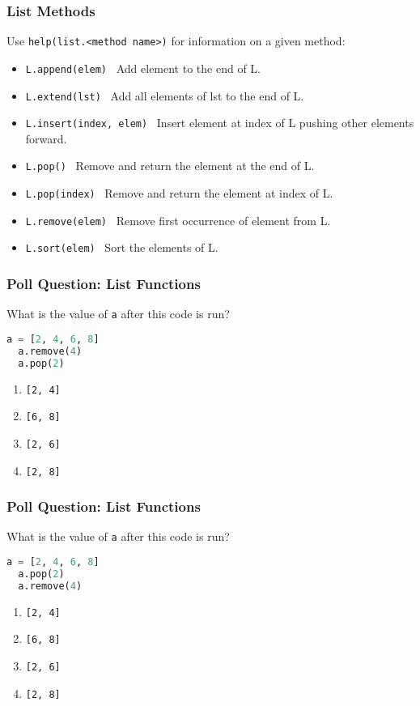 \documentclass{beamer}
\begin{document}
%
%
\begin{frame}[fragile]
  \frametitle{List Methods}
  Use \lstinline|help(list.<method name>)| for information on a given method:
  \begin{itemize}
    \item \lstinline|L.append(elem)| \textrightarrow \ Add element to the end of L.
    \item \lstinline|L.extend(lst)| \textrightarrow \ Add all elements of lst to the end of L.
    \item \lstinline|L.insert(index, elem)| \textrightarrow \ Insert element at index of L pushing other elements forward.
    \item \lstinline|L.pop()| \textrightarrow \ Remove and return the element at the end of L.
    \item \lstinline|L.pop(index)| \textrightarrow \ Remove and return the element at index of L.
    \item \lstinline|L.remove(elem)| \textrightarrow \ Remove first occurrence of element from L.
    \item \lstinline|L.sort(elem)| \textrightarrow \ Sort the elements of L.
  \end{itemize}
\end{frame}

%
%
\begin{frame}[fragile]
  \frametitle{Poll Question: List Functions}
  What is the value of \lstinline|a| after this code is run?
  \begin{lstlisting}[language=Python, autogobble]
  a = [2, 4, 6, 8]
  a.remove(4)
  a.pop(2)
  \end{lstlisting}
  \vfill
  \begin{enumerate}[A]
    \item \lstinline|[2, 4]|
    \item \lstinline|[6, 8]|
    \item \lstinline|[2, 6]|
    \item \lstinline|[2, 8]|
  \end{enumerate}
\end{frame}

%
%
\begin{frame}[fragile]
  \frametitle{Poll Question: List Functions}
  What is the value of \lstinline|a| after this code is run?
  \begin{lstlisting}[language=Python, autogobble]
  a = [2, 4, 6, 8]
  a.pop(2)
  a.remove(4)
  \end{lstlisting}
  \vfill
  \begin{enumerate}[A]
    \item \lstinline|[2, 4]|
    \item \lstinline|[6, 8]|
    \item \lstinline|[2, 6]|
    \item \lstinline|[2, 8]|
  \end{enumerate}
\end{frame}
\end{document}
